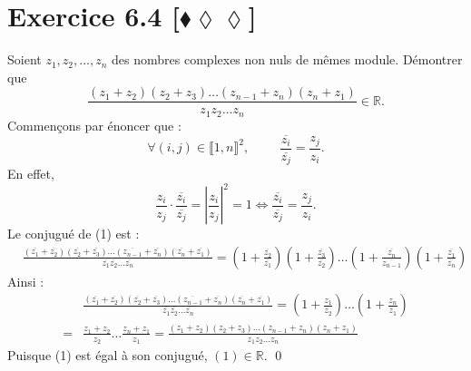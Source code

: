 \documentclass[10pt]{article}
\begin{document}

\section*{Exercice 6.4 [$\blacklozenge\lozenge\lozenge$]}
\begin{tcolorbox}[enhanced, width=7in, center, size=fbox, fontupper=\large, drop shadow southwest]
    Soient $z_1,z_2,\dots,z_n$ des nombres complexes non nuls de mêmes module. Démontrer que
    \begin{equation}
        \frac{(z_1 + z_2)(z_2 + z_3)\dots(z_{n-1}+z_n)(z_n + z_1)}{z_1z_2\dots z_n} \in \mathbb{R}.
    \end{equation}
    Commençons par énoncer que :
    \begin{equation*}
        \forall{(i,j)\in\llbracket1,n\rrbracket^2}, \hspace{1cm} \frac{\overline{z_i}}{\overline{z_j}}=\frac{z_j}{z_i}.
    \end{equation*}
    En effet,
    \begin{equation*}
        \frac{z_i}{z_j}\cdot\frac{\overline{z_i}}{\overline{z_j}}=\left|\frac{z_i}{z_j}\right|^2=1 \iff \frac{\overline{z_i}}{\overline{z_j}}=\frac{z_j}{z_i}.
    \end{equation*}
    Le conjugué de (1) est :
    \begin{align*}
        &\frac{(\overline{z_1} + \overline{z_2})(\overline{z_2} + \overline{z_3})\dots(\overline{z_{n-1}}+\overline{z_n})(\overline{z_n} + \overline{z_1})}{\overline{z_1}\overline{z_2}\dots\overline{z_n}}=(1+\frac{\overline{z_2}}{\overline{z_1}})(1+\frac{\overline{z_3}}{\overline{z_2}})\dots(1+\frac{\overline{z_n}}{\overline{z_{n-1}}})(1+\frac{\overline{z_1}}{\overline{z_n}})
    \end{align*}
    Ainsi :
    \begin{align*}
        &\frac{(\overline{z_1} + \overline{z_2})(\overline{z_2} + \overline{z_3})\dots(\overline{z_{n-1}}+\overline{z_n})(\overline{z_n} + \overline{z_1})}{\overline{z_1}\overline{z_2}\dots\overline{z_n}}=(1+\frac{z_1}{z_2})\dots(1+\frac{z_n}{z_1})\\
        =&\frac{z_1+z_2}{z_2}\dots\frac{z_n+z_1}{z_1}=\frac{(z_1+z_2)(z_2+z_3)\dots(z_{n-1}+z_n)(z_n+z_1)}{z_1z_2\dots z_n}
    \end{align*}
    Puisque (1) est égal à son conjugué, $(1) \in \mathbb{R}$.
    \qed
\end{tcolorbox}
\end{document}
